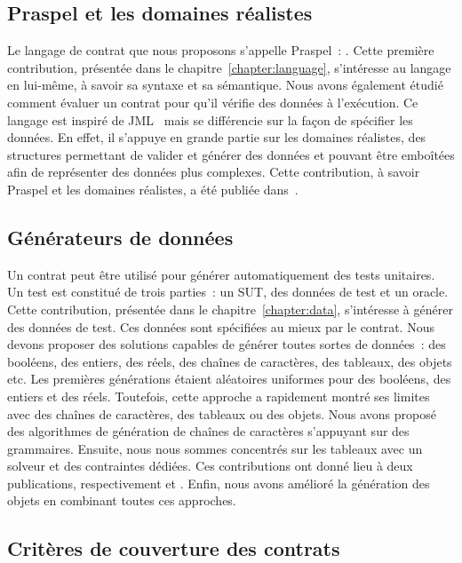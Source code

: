 \subsection{Praspel et les domaines réalistes}

Le langage de contrat que nous proposons s'appelle {\strong Praspel}~:
. Cette première
contribution, présentée dans le chapitre~\ref{chapter:language}, s'intéresse au
langage en lui-même, à savoir sa syntaxe et sa sémantique. Nous avons également
étudié comment évaluer un contrat pour qu'il vérifie des données à l'exécution.
Ce langage est inspiré de JML~ mais se différencie sur la façon de
spécifier les données. En effet, il s'appuye en grande partie sur les {\strong
domaines réalistes}, des structures permettant de valider et générer des données
et pouvant être emboîtées afin de représenter des données plus complexes. Cette
contribution, à savoir Praspel et les domaines réalistes, a été publiée
dans~.

\subsection{Générateurs de données}

Un contrat peut être utilisé pour générer automatiquement des tests unitaires.
Un test est constitué de trois parties~: un SUT, des données de test et un
oracle. Cette contribution, présentée dans le chapitre~\ref{chapter:data},
s'intéresse à générer des données de test. Ces données sont spécifiées au mieux
par le contrat. Nous devons proposer des solutions capables de générer toutes
sortes de données~: des booléens, des entiers, des réels, des chaînes de
caractères, des tableaux, des objets etc. Les premières générations étaient
aléatoires uniformes pour des booléens, des entiers et des réels. Toutefois,
cette approche a rapidement montré ses limites avec des chaînes de caractères,
des tableaux ou des objets. Nous avons proposé des algorithmes de génération de
chaînes de caractères s'appuyant sur des grammaires. Ensuite, nous nous sommes
concentrés sur les tableaux avec un solveur et des contraintes dédiées. Ces
contributions ont donné lieu à deux publications, respectivement
 et . Enfin, nous avons amélioré la
génération des objets en combinant toutes ces approches.

\subsection{Critères de couverture des contrats}

